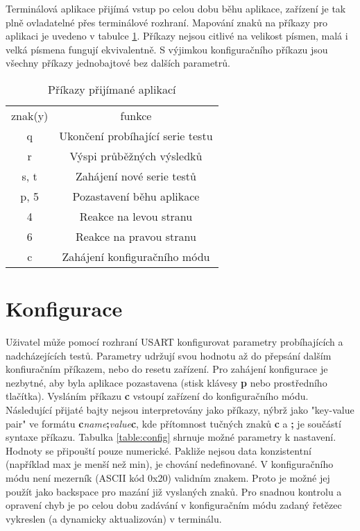 \documentclass[twoside]{article}
\begin{document}
Terminálová aplikace přijímá vstup po celou dobu běhu aplikace, zařízení je tak plně ovladatelné přes terminálové rozhraní.
Mapování znaků na příkazy pro aplikaci je uvedeno v tabulce \ref{table:commands}.
Příkazy nejsou citlivé na velikost písmen, malá i velká písmena fungují ekvivalentně.
S výjimkou konfiguračního příkazu jsou všechny příkazy jednobajtové bez dalších parametrů.

\begin{table}[htbp]
    \centering
    \begin{tabular}{c|c}
        znak(y) & funkce \\
        q & Ukončení probíhající serie testu \\
        r & Výspi průběžných výsledků \\
        s, t & Zahájení nové serie testů \\
        p, 5 & Pozastavení běhu aplikace \\
        4 & Reakce na levou stranu \\
        6 & Reakce na pravou stranu \\
        c & Zahájení konfiguračního módu
    \end{tabular}
    \caption{Příkazy přijímané aplikací}
    \label{table:commands}
\end{table}

\section{Konfigurace}

Uživatel může pomocí rozhraní USART konfigurovat parametry probíhajících a nadcházejících testů.
Parametry udržují svou hodnotu až do přepsání dalším konfiuračním příkazem, nebo do resetu zařízení.
Pro zahájení konfigurace je nezbytné, aby byla aplikace pozastavena (stisk klávesy \textbf{p} nebo prostředního tlačítka).
Vysláním příkazu \textbf{c} vstoupí zařízení do konfiguračního módu. Následující přijaté bajty nejsou interpretovány jako
příkazy, nýbrž jako "key-value pair" ve formátu \textbf{c}\textit{name}\textbf{;}\textit{value}\textbf{c}, kde
přítomnost tučných znaků \textbf{c} a \textbf{;} je součástí syntaxe příkazu.
Tabulka \ref{table:config} shrnuje možné parametry k nastavení.
Hodnoty se připouští pouze numerické. Pakliže nejsou data konzistentní (například max je menší než min), je chování nedefinované.
V konfiguračního módu není mezerník (ASCII kód 0x20) validním znakem. Proto je možné jej použít jako backspace pro mazání již
vyslaných znaků. Pro snadnou kontrolu a opravení chyb je po celou dobu zadávání v konfiguračním módu zadaný řetězec vykreslen
 (a dynamicky aktualizován) v terminálu.
\end{document}
